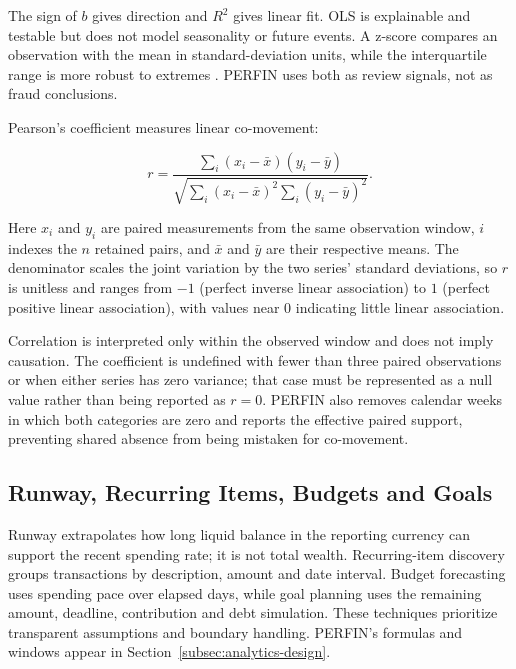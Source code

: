 The sign of $b$ gives direction and $R^2$ gives linear fit. OLS is explainable and testable but does not model seasonality or future events. A z-score compares an observation with the mean in standard-deviation units, while the interquartile range is more robust to extremes \cite{tukey1977}. PERFIN uses both as review signals, not as fraud conclusions.

Pearson's coefficient \cite{pearson1895} measures linear co-movement:

\begin{equation}
  r=\frac{\sum_i(x_i-\bar{x})(y_i-\bar{y})}
  {\sqrt{\sum_i(x_i-\bar{x})^2\sum_i(y_i-\bar{y})^2}}.
\end{equation}

Here $x_i$ and $y_i$ are paired measurements from the same observation window, $i$ indexes the $n$ retained pairs, and $\bar{x}$ and $\bar{y}$ are their respective means. The denominator scales the joint variation by the two series' standard deviations, so $r$ is unitless and ranges from $-1$ (perfect inverse linear association) to $1$ (perfect positive linear association), with values near 0 indicating little linear association.

Correlation is interpreted only within the observed window and does not imply causation.
The coefficient is undefined with fewer than three paired observations or when either
series has zero variance; that case must be represented as a null value rather than
being reported as $r=0$. PERFIN also removes calendar weeks in which both categories
are zero and reports the effective paired support, preventing shared absence from
being mistaken for co-movement.

\subsection{Runway, Recurring Items, Budgets and Goals}

Runway extrapolates how long liquid balance in the reporting currency can support the recent spending rate; it is not total wealth. Recurring-item discovery groups transactions by description, amount and date interval. Budget forecasting uses spending pace over elapsed days, while goal planning uses the remaining amount, deadline, contribution and debt simulation. These techniques prioritize transparent assumptions and boundary handling. PERFIN's formulas and windows appear in Section~\ref{subsec:analytics-design}.

